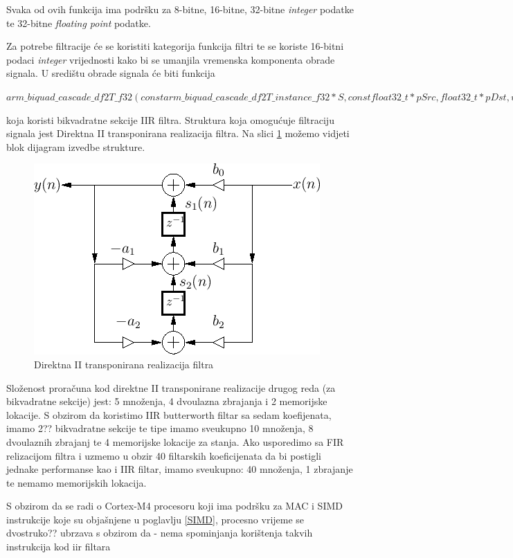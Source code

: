 \documentclass[times, utf8, diplomski]{fer}
\begin{document}
Svaka od ovih funkcija ima podršku za 8-bitne, 16-bitne, 32-bitne \textit{integer} podatke te 32-bitne \textit{floating point} podatke.

Za potrebe filtracije će se koristiti kategorija funkcija filtri te se koriste 16-bitni podaci \textit{integer} vrijednosti kako bi se umanjila vremenska komponenta obrade signala. U središtu obrade signala će biti funkcija 

\textit{$arm\_biquad\_cascade\_df2T\_f32 (const arm\_biquad\_cascade\_df2T\_instance\_f32 *S, const float32\_t *pSrc, float32\_t *pDst, uint32\_t blockSize)$} 

koja koristi bikvadratne sekcije IIR filtra. Struktura koja omogućuje filtraciju signala jest Direktna II transponirana realizacija filtra. Na slici \ref{df2t} možemo vidjeti blok dijagram izvedbe strukture.

\begin{figure}[hbt!]
 \centering
 \includegraphics[scale=0.6]{photos/df2t.png}
 \caption{Direktna II transponirana realizacija filtra}
 \label{df2t}
\end{figure}

Složenost proračuna kod direktne II transponirane realizacije drugog reda (za bikvadratne sekcije) jest: 5 množenja, 4 dvoulazna zbrajanja i 2 memorijske lokacije. S obzirom da koristimo IIR butterworth filtar sa sedam koefijenata, imamo 2?? bikvadratne sekcije te tipe imamo sveukupno 10 množenja, 8 dvoulaznih zbrajanj te 4 memorijske lokacije za stanja. Ako usporedimo sa FIR relizacijom filtra i uzmemo u obzir 40 filtarskih koeficijenata da bi postigli jednake performanse kao i IIR filtar, imamo sveukupno: 40 množenja, 1 zbrajanje te nemamo memorijskih lokacija.


S obzirom da se radi o Cortex-M4 procesoru koji ima podršku za MAC i SIMD instrukcije koje su objašnjene u poglavlju \ref{SIMD}, procesno vrijeme se dvostruko?? ubrzava s obzirom da - nema spominjanja korištenja takvih instrukcija kod iir filtara
\end{document}
